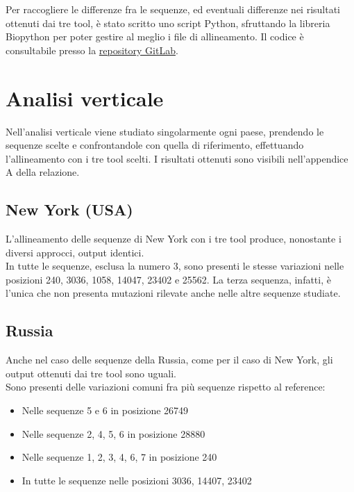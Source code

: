 \documentclass[a4paper,10pt]{article}
\begin{document}
Per raccogliere le differenze fra le sequenze, ed eventuali differenze nei risultati ottenuti dai tre tool, è stato scritto uno script Python, sfruttando la libreria Biopython per poter gestire al meglio i file di allineamento. Il codice è consultabile presso la \textcolor{blue}{\href{https://gitlab.com/i.bettini/bioinformatic}{repository GitLab}}.

\section{Analisi verticale}
Nell'analisi verticale viene studiato singolarmente ogni paese, prendendo le sequenze scelte e confrontandole con quella di riferimento, effettuando l'allineamento con i tre tool scelti. I risultati ottenuti sono visibili nell'appendice A della relazione.

\subsection{New York (USA)}
L'allineamento delle sequenze di New York con i tre tool produce, nonostante i diversi approcci, output identici.\\ 
In tutte le sequenze, esclusa la numero 3, sono presenti le stesse variazioni nelle posizioni 240, 3036, 1058, 14047, 23402 e 25562.
La terza sequenza, infatti, è l'unica che non presenta mutazioni rilevate anche nelle altre sequenze studiate.

\subsection{Russia}
Anche nel caso delle sequenze della Russia, come per il caso di New York, gli output ottenuti dai tre tool sono uguali.\\
Sono presenti delle variazioni comuni fra più sequenze rispetto al reference:
\begin{itemize}
\item Nelle sequenze 5 e 6 in posizione 26749
\item Nelle sequenze 2, 4, 5, 6 in posizione 28880
\item Nelle sequenze 1, 2, 3, 4, 6, 7 in posizione 240
\item In tutte le sequenze nelle posizioni 3036, 14407, 23402
\end{itemize}
\end{document}
